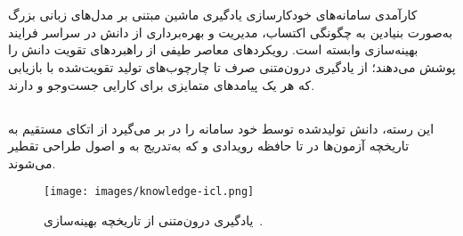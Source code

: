 \section[تحلیل منابع دانش]{}

کارآمدی سامانه‌های خودکارسازی یادگیری ماشین مبتنی بر مدل‌های زبانی بزرگ به‌صورت بنیادین به چگونگی اکتساب، مدیریت و بهره‌برداری از دانش در سراسر فرایند بهینه‌سازی وابسته است. رویکردهای معاصر طیفی از راهبردهای تقویت دانش را پوشش می‌دهند؛ از یادگیری درون‌متنی صرف تا چارچوب‌های تولید تقویت‌شده با بازیابی که هر یک پیامدهای متمایزی برای کارایی جست‌وجو و  دارند.

\subsection[دانش درونی: تاریخچه آزمون و بازتاب]{}
این رسته، دانش تولیدشده توسط خود سامانه را در بر می‌گیرد از اتکای مستقیم به تاریخچه آزمون‌ها در  تا حافظه رویدادی و  که به‌تدریج به  و اصول طراحی تقطیر می‌شوند.
\begin{figure}[h!]
    \centering
    \texttt{[image: images/knowledge-icl.png]}
    \caption[]{یادگیری درون‌متنی از تاریخچه بهینه‌سازی~\cite{liu2025agenthpo}.
    }
    \label{fig:knowledge-icl}
\end{figure}
\subsubsection{\protect{}}

